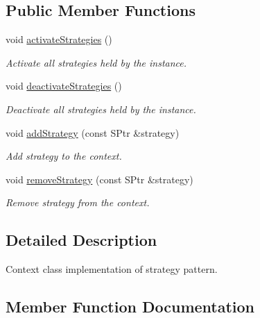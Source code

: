 \subsection*{Public Member Functions}
\begin{DoxyCompactItemize}
\item 
void \hyperlink{classAlarmStrategyOwner_a2e150fb66eda048ece19da4ebf3605cf}{activate\+Strategies} ()\hypertarget{classAlarmStrategyOwner_a2e150fb66eda048ece19da4ebf3605cf}{}\label{classAlarmStrategyOwner_a2e150fb66eda048ece19da4ebf3605cf}

\begin{DoxyCompactList}\small\item\em Activate all strategies held by the instance. \end{DoxyCompactList}\item 
void \hyperlink{classAlarmStrategyOwner_a24165674f81b7414ea7f49addf7afc0a}{deactivate\+Strategies} ()\hypertarget{classAlarmStrategyOwner_a24165674f81b7414ea7f49addf7afc0a}{}\label{classAlarmStrategyOwner_a24165674f81b7414ea7f49addf7afc0a}

\begin{DoxyCompactList}\small\item\em Deactivate all strategies held by the instance. \end{DoxyCompactList}\item 
void \hyperlink{classAlarmStrategyOwner_a38dde4dca444585387df6db6bf352349}{add\+Strategy} (const S\+Ptr \&strategy)
\begin{DoxyCompactList}\small\item\em Add strategy to the context. \end{DoxyCompactList}\item 
void \hyperlink{classAlarmStrategyOwner_a50ca40d662757f37fdb17194fdbb165a}{remove\+Strategy} (const S\+Ptr \&strategy)
\begin{DoxyCompactList}\small\item\em Remove strategy from the context. \end{DoxyCompactList}\end{DoxyCompactItemize}


\subsection{Detailed Description}
Context class implementation of strategy pattern. 

\subsection{Member Function Documentation}

